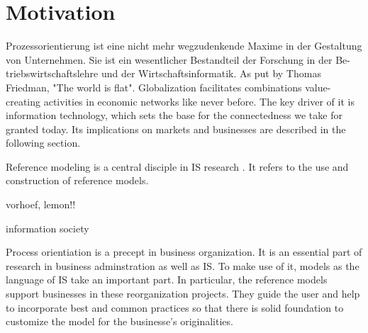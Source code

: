 \chapter{Motivation}

Prozessorientierung ist eine nicht mehr wegzudenkende Maxime in der Gestaltung von Unternehmen. Sie ist ein wesentlicher Bestandteil der Forschung in der Be- triebswirtschaftslehre und der Wirtschaftsinformatik.
As put by Thomas Friedman, "The world is flat". Globalization facilitates combinations value-creating activities in economic networks like never before. The key driver of it is information technology, which sets the base for the connectedness we take for granted today. Its implications on markets and businesses are described in the following section. 

Reference modeling is a central disciple in IS research \cite{Fettke2004, konig1996entwicklung, becker2004handelsinformationssysteme}. It refers to the use and construction of reference models.

vorhoef, lemon!!

information society


Process orientiation is a precept in business organization. It is an essential part of research in business adminstration as well as \acrfull{IS}. To make use of it, models as the language of \acrshort{IS} take an important part. In particular, the reference models support businesses in these reorganization projects. They guide the user and help to incorporate best and common practices so that there is solid foundation to customize the model for the businesse's originalities.  


